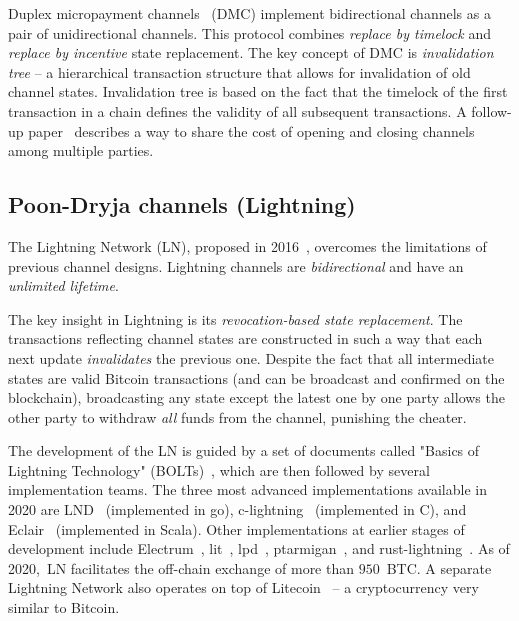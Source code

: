 Duplex micropayment channels~\cite{Decker2015} (DMC) implement bidirectional channels as a pair of unidirectional channels.
This protocol combines \textit{replace by timelock} and \textit{replace by incentive} state replacement.
The key concept of DMC is \textit{invalidation tree} -- a hierarchical transaction structure that allows for invalidation of old channel states.
Invalidation tree is based on the fact that the timelock of the first transaction in a chain defines the validity of all subsequent transactions.
A follow-up paper~\cite{Burchert2017} describes a way to share the cost of opening and closing channels among multiple parties.


\subsection{Poon-Dryja channels (Lightning)}

The Lightning Network (LN), proposed in 2016~\cite{Poon2016}, overcomes the limitations of previous channel designs.
Lightning channels are \textit{bidirectional} and have an \textit{unlimited lifetime}.

The key insight in Lightning is its \textit{revocation-based state replacement}.
The transactions reflecting channel states are constructed in such a way that each next update \textit{invalidates} the previous one.
Despite the fact that all intermediate states are valid Bitcoin transactions (and can be broadcast and confirmed on the blockchain), broadcasting any state except the latest one by one party allows the other party to withdraw \textit{all} funds from the channel, punishing the cheater.

The development of the LN is guided by a set of documents called "Basics of Lightning Technology" (BOLTs)~\cite{BOLT}, which are then followed by several implementation teams.
The three most advanced implementations available in 2020 are LND~\cite{LND} (implemented in go), c-lightning~\cite{clightning} (implemented in C), and Eclair~\cite{Eclair} (implemented in Scala).
Other implementations at earlier stages of development include Electrum~\cite{ElectrumWebsite, ElectrumLightningAnnounce}, lit~\cite{lit}, lpd~\cite{lpd}, ptarmigan~\cite{ptarmigan}, and rust-lightning~\cite{rustlightning}.
As of 2020,~LN facilitates the off-chain exchange of more than $950$~BTC\@.
A separate Lightning Network also operates on top of Litecoin~\cite{1MLLitecoin} -- a cryptocurrency very similar to Bitcoin.

